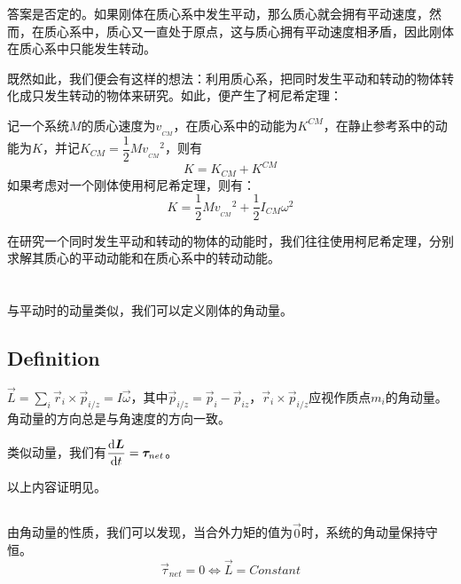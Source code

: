 答案是否定的。如果刚体在质心系中发生平动，那么质心就会拥有平动速度，然而，在质心系中，质心又一直处于原点，这与质心拥有平动速度相矛盾，因此刚体在质心系中只能发生转动。

既然如此，我们便会有这样的想法：利用质心系，把同时发生平动和转动的物体转化成只发生转动的物体来研究。如此，便产生了柯尼希定理：

\begin{law}
    记一个系统$M$的质心速度为$v_{_{CM}}$，在质心系中的动能为$K^{CM}$，在静止参考系中的动能为$K$，并记$K_{CM}=\dfrac{1}{2}Mv_{_{CM}}{}^2$，则有
    \[K=K_{CM}+K^{CM}\]
    如果考虑对一个刚体使用柯尼希定理，则有：
    \[K=\dfrac{1}{2}Mv_{_{CM}}{}^2+\dfrac{1}{2}I_{CM}\omega^2\]
\end{law}

在研究一个同时发生平动和转动的物体的动能时，我们往往使用柯尼希定理，分别求解其质心的平动动能和在质心系中的转动动能。
\section[角动量]{}
与平动时的动量类似，我们可以定义刚体的角动量。
\subsection[定义]{Definition}
\begin{Itemize}
    \item {} $\displaystyle\vec{L}=\sum_i\vec{r}_i\times\vec{p}_{i/z}=I\vec{\omega}$，其中$\vec{p}_{i/z}=\vec{p}_i-\vec{p}_{iz}$，$ \vec{r}_i\times\vec{p}_{i/z}$应视作质点$m_i$的角动量。角动量的方向总是与角速度的方向一致\footnotemark。
    \item 类似动量，我们有$\dfrac{\dif \vec{L}}{\dif t}=\vec{\tau}_{net}$。
\end{Itemize}
以上内容证明见。

\subsection[角动量守恒]{}
\begin{Itemize}
    \item {}由角动量的性质，我们可以发现，当合外力矩的值为$\vec{0}$时，系统的角动量保持守恒。
    \[\vec{\tau}_{net}=0\Leftrightarrow\vec{L}=Constant\]
\end{Itemize}

